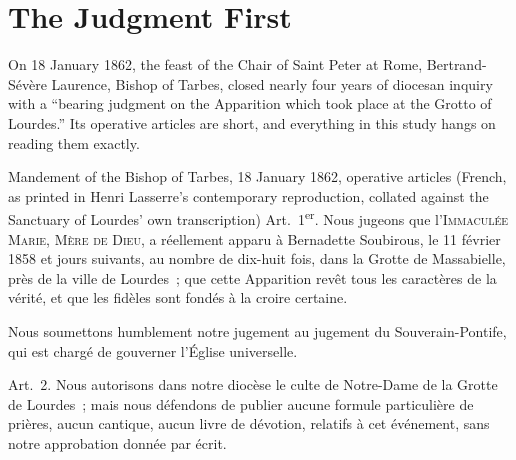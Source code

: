 \section{The Judgment First}

On 18 January 1862, the feast of the Chair of Saint Peter at Rome,
Bertrand-S\'ev\`ere Laurence, Bishop of Tarbes, closed nearly four
years of diocesan inquiry with a  ``bearing judgment
on the Apparition which took place at the Grotto of Lourdes.'' Its
operative articles are short, and everything in this study hangs on
reading them exactly.

\begin{operativetext}{Mandement of the Bishop of Tarbes, 18 January
1862, operative articles (French, as printed in Henri Lasserre's
contemporary reproduction, collated against the Sanctuary of
Lourdes' own transcription)}
Art.~1\textsuperscript{er}. Nous jugeons que l'\textsc{Immacul\'ee
Marie, M\`ere de Dieu}, a r\'eellement apparu \`a Bernadette
Soubirous, le 11 f\'evrier 1858 et jours suivants, au nombre de
dix-huit fois, dans la Grotte de Massabielle, pr\`es de la ville de
Lourdes~; que cette Apparition rev\^et tous les caract\`eres de la
v\'erit\'e, et que les fid\`eles sont fond\'es \`a la croire
certaine.\par
Nous soumettons humblement notre jugement au jugement du
Souverain-Pontife, qui est charg\'e de gouverner l'\'Eglise
universelle.\par
Art.~2. Nous autorisons dans notre dioc\`ese le culte de Notre-Dame
de la Grotte de Lourdes~; mais nous d\'efendons de publier aucune
formule particuli\`ere de pri\`eres, aucun cantique, aucun livre de
d\'evotion, relatifs \`a cet \'ev\'enement, sans notre approbation
donn\'ee par \'ecrit.
\end{operativetext}


